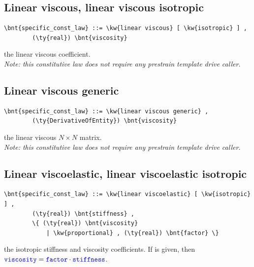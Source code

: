 \subsection{Linear viscous, linear viscous isotropic}
\begin{Verbatim}[commandchars=\\\{\}]
    \bnt{specific_const_law} ::= \kw{linear viscous} [ \kw{isotropic} ] , 
        (\ty{real}) \bnt{viscosity}
\end{Verbatim}
the linear viscous coefficient. \\
{\em 
    Note: this constitutive law does not require any prestrain template
    drive caller.
}
  
\subsection{Linear viscous generic}
\begin{Verbatim}[commandchars=\\\{\}]
    \bnt{specific_const_law} ::= \kw{linear viscous generic} , 
        (\ty{DerivativeOfEntity}) \bnt{viscosity}
\end{Verbatim}
the linear viscous $N \times N $ matrix. \\
{\em 
    Note: this constitutive law does not require any prestrain template
    drive caller.
}
  
\subsection{Linear viscoelastic, linear viscoelastic isotropic}
\begin{Verbatim}[commandchars=\\\{\}]
    \bnt{specific_const_law} ::= \kw{linear viscoelastic} [ \kw{isotropic} ] ,
        (\ty{real}) \bnt{stiffness} ,
        \{ (\ty{real}) \bnt{viscosity}
            | \kw{proportional} , (\ty{real}) \bnt{factor} \}
\end{Verbatim}
the isotropic stiffness and viscosity coefficients.
If  is given, then
$\textcolor{blue}{\texttt{viscosity}} = \textcolor{blue}{\texttt{factor}} \cdot \textcolor{blue}{\texttt{stiffness}}$.
  
